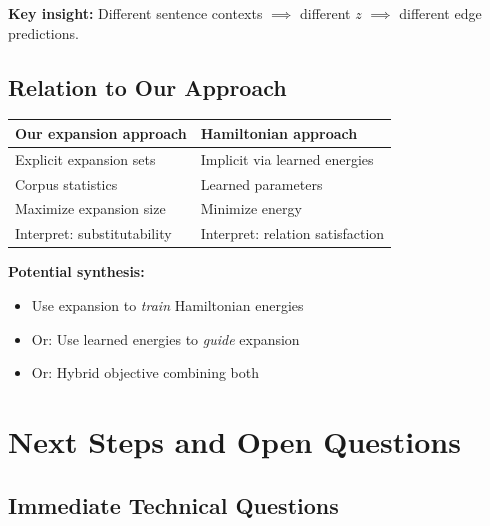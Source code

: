 \documentclass[11pt]{article}
\begin{document}
\textbf{Key insight:} Different sentence contexts $\implies$ different $z$ $\implies$ different edge predictions.

\subsection{Relation to Our Approach}

\begin{center}
\begin{tabular}{l|l}
\textbf{Our expansion approach} & \textbf{Hamiltonian approach} \\
\hline
Explicit expansion sets & Implicit via learned energies \\
Corpus statistics & Learned parameters \\
Maximize expansion size & Minimize energy \\
Interpret: substitutability & Interpret: relation satisfaction \\
\end{tabular}
\end{center}

\textbf{Potential synthesis:}
\begin{itemize}
\item Use expansion to \emph{train} Hamiltonian energies
\item Or: Use learned energies to \emph{guide} expansion
\item Or: Hybrid objective combining both
\end{itemize}

\section{Next Steps and Open Questions}

\subsection{Immediate Technical Questions}
\end{document}
